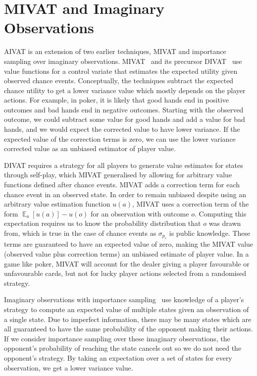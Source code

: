\documentclass[letterpaper]{article}
\def\VAT{AIVAT}
\begin{document}
\section{MIVAT and Imaginary Observations}
\VAT{} is an extension of two earlier techniques, MIVAT and importance
sampling over imaginary observations. MIVAT~\cite{09white-mivat} and
its precursor DIVAT~\cite{06zinkevich-divat} use value functions for a
control variate that estimates the expected utility given observed
chance events. Conceptually, the techniques subtract the expected
chance utility to get a lower variance value which mostly depends on
the player actions. For example, in poker, it is likely that good
hands end in positive outcomes and bad hands end in negative
outcomes. Starting with the observed outcome, we could subtract some
value for good hands and add a value for bad hands, and we would
expect the corrected value to have lower variance. If the expected
value of the correction terms is zero, we can use the lower variance
corrected value as an unbiased estimator of player value.

DIVAT requires a strategy for all players to generate value estimates
for states through self-play, which MIVAT generalised by allowing for
arbitrary value functions defined after chance events. MIVAT adds a
correction term for each chance event in an observed state. In order
to remain unbiased despite using an arbitrary value estimation
function $u(a)$, MIVAT uses a correction term of the form
$\mathop{\mathbb{E}}_a[u(a)] - u(o)$ for an observation with outcome
$o$. Computing this expectation requires us to know the probability
distribution that $o$ was drawn from, which is true in the case of
chance events as $\sigma_{p_c}$ is public knowledge. These terms are
guaranteed to have an expected value of zero, making the MIVAT value
(observed value plus correction terms) an unbiased estimate of player
value.  In a game like poker, MIVAT will account for the dealer giving
a player favourable or unfavourable cards, but not for lucky player
actions selected from a randomised strategy.

Imaginary observations with importance sampling~\cite{08icml-ispoker}
use knowledge of a player's strategy to compute an expected value of
multiple states given an observation of a single state. Due to
imperfect information, there may be many states which are all
guaranteed to have the same probability of the opponent making their
actions. If we consider importance sampling over these imaginary
observations, the opponent's probability of reaching the state cancels
out so we do not need the opponent's strategy. By taking an
expectation over a set of states for every observation, we get a lower
variance value.
\end{document}
